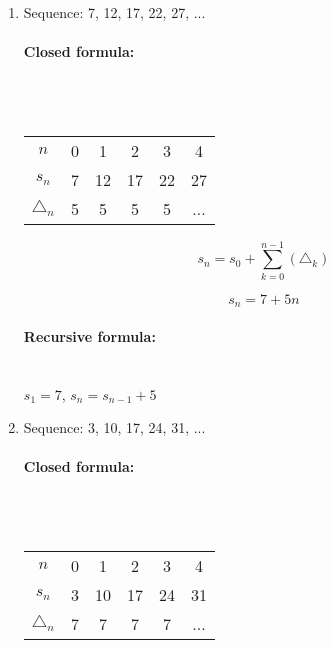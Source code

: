 
\newcommand{\laClass}       {CS 211}
\newcommand{\laSemester}    {Spring 2018}
\newcommand{\laChapter}     {5.}
\newcommand{\laType}        {Exercise}
\newcommand{\laPoints}      {5}
\newcommand{\laTitle}       {Solving Recurrence Relations}
\newcommand{\laDate}        {Jan 16, 2018}
\setcounter{chapter}{5}
\setcounter{section}{6}
\addtocounter{section}{-1}

\toggletrue{answerkey}






    \begin{enumerate}
        \item   Sequence: 7, 12, 17, 22, 27, ... 
                \paragraph{Closed formula:} ~\\~\\
                \begin{tabular}{c | c c c c c}
                    $n$
                        & 0 & 1 & 2 & 3 & 4
                    \\
                    $s_{n}$
                        & 7 & 12 & 17 & 22 & 27
                    \\
                    $\triangle_{n}$
                        & 5 & 5 & 5 & 5 & ...
                \end{tabular} 
                
                $$s_{n} = s_{0} + \sum_{k=0}^{n-1} ( \triangle_{k} )$$
                 
                $$s_{n} = 7 + 5n$$

                \paragraph{Recursive formula:} ~\\
                $s_{1} = 7$, $s_{n} = s_{n-1} + 5$ ~\\

        \item   Sequence: 3, 10, 17, 24, 31, ...
                \paragraph{Closed formula:} ~\\~\\
                \begin{tabular}{c | c c c c c}
                    $n$
                        & 0 & 1 & 2 & 3 & 4
                    \\
                    $s_{n}$
                        & 3 & 10 & 17 & 24 & 31
                    \\
                    $\triangle_{n}$
                        & 7 & 7 & 7 & 7 & ...
                \end{tabular}
                

\end{enumerate}
